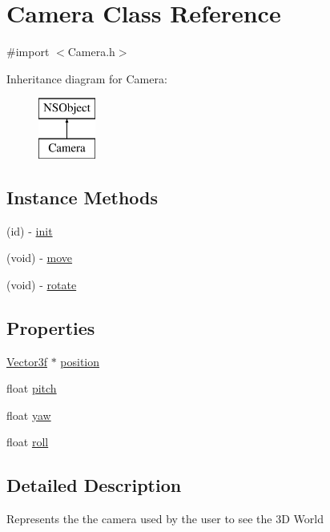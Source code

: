 \hypertarget{interface_camera}{}\section{Camera Class Reference}
\label{interface_camera}


{\ttfamily \#import $<$Camera.\+h$>$}

Inheritance diagram for Camera\+:\begin{figure}[H]
\begin{center}
\leavevmode
\includegraphics[height=2.000000cm]{interface_camera}
\end{center}
\end{figure}
\subsection*{Instance Methods}
\begin{DoxyCompactItemize}
\item 
(id) -\/ \hyperlink{interface_camera_a4633f7c2d8c298e9162d5c5b6a6ffe2c}{init}
\item 
(void) -\/ \hyperlink{interface_camera_a8414e6d74d3f6259fa5ea1f037e9d8bd}{move}
\item 
(void) -\/ \hyperlink{interface_camera_a89225863307bdbd309fb52a7904bc4db}{rotate}
\end{DoxyCompactItemize}
\subsection*{Properties}
\begin{DoxyCompactItemize}
\item 
\hyperlink{interface_vector3f}{Vector3f} $\ast$ \hyperlink{interface_camera_a59764f8faf1cd481eaa02d504ed088cd}{position}
\item 
float \hyperlink{interface_camera_ab56fcb39f580e8d2159cf2c9c6d9a65a}{pitch}
\item 
float \hyperlink{interface_camera_ad76701b22630f2df28a0ae15f0497a3a}{yaw}
\item 
float \hyperlink{interface_camera_a08d9c6119a859e664d74ca07db4fe3d3}{roll}
\end{DoxyCompactItemize}


\subsection{Detailed Description}
Represents the the camera used by the user to see the 3D World 

